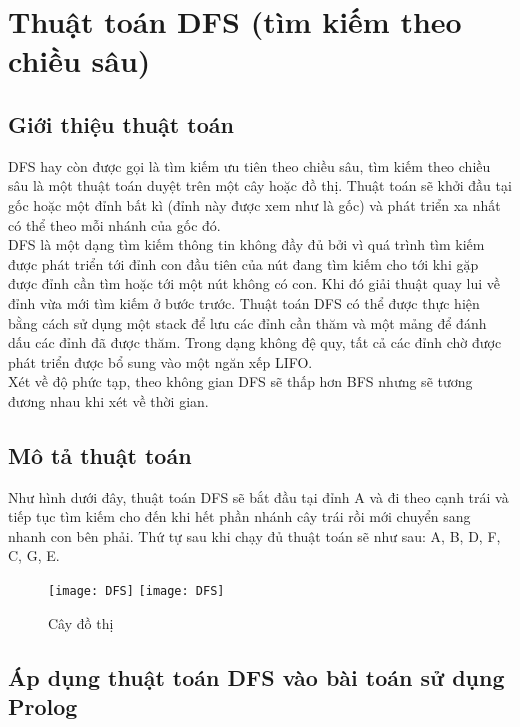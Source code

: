 \chapter{Thuật toán DFS (tìm kiếm theo chiều sâu)}
\ifpdf
    \graphicspath{{Chapter3/Chapter3Figs/PNG/}{Chapter3/Chapter3Figs/PDF/}{Chapter3/Chapter3Figs/}}
\else
    \graphicspath{{Chapter3/Chapter3Figs/EPS/}{Chapter3/Chapter3Figs/}}
\fi


\section{Giới thiệu thuật toán}
DFS hay còn được gọi là tìm kiếm ưu tiên theo chiều sâu, tìm kiếm theo chiều sâu là một thuật toán duyệt trên một cây hoặc đồ thị. Thuật toán sẽ khởi đầu tại gốc hoặc một đỉnh bất kì (đỉnh này được xem như là gốc) và phát triển xa nhất có thể theo mỗi nhánh của gốc đó.\\
DFS là một dạng tìm kiếm thông tin không đầy đủ bởi vì quá trình tìm kiếm được phát triển tới đỉnh con đầu tiên của nút đang tìm kiếm cho tới khi gặp được đỉnh cần tìm hoặc tới một nút không có con. Khi đó giải thuật quay lui về đỉnh vừa mới tìm kiếm ở bước trước. Thuật toán DFS có thể được thực hiện bằng cách sử dụng một stack để lưu các đỉnh cần thăm và một mảng để đánh dấu các đỉnh đã được thăm. Trong dạng không đệ quy, tất cả các đỉnh chờ được phát triển được bổ sung vào một ngăn xếp LIFO.
\\ Xét về độ phức tạp, theo không gian DFS sẽ thấp hơn BFS nhưng sẽ tương đương nhau khi xét về thời gian.
\section{Mô tả thuật toán}
Như hình dưới đây, thuật toán DFS sẽ bắt đầu tại đỉnh A và đi theo cạnh trái và tiếp tục tìm kiếm cho đến khi hết phần nhánh cây trái rồi mới chuyển sang nhanh con bên phải. Thứ tự sau khi chạy đủ thuật toán sẽ như sau: A, B, D, F,  C, G, E.\\

\begin{figure}[!htbp]
  \begin{center}
    \leavevmode
    \ifpdf
      \texttt{[image: DFS]}
    \else
      \texttt{[image: DFS]}
    \fi
    \caption{Cây đồ thị}
    \label{FigAir}
  \end{center}
\end{figure}

\section{Áp dụng thuật toán DFS vào bài toán sử dụng Prolog}
